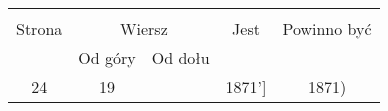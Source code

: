 \documentclass[a4paper,11pt]{article}
\begin{document}


\begin{center}

  \begin{tabular}{|c|c|c|c|c|}
    \hline
    & \multicolumn{2}{c|}{} & & \\
    Strona & \multicolumn{2}{c|}{Wiersz} & Jest
                              & Powinno być \\ \cline{2-3}
    & Od góry & Od dołu & & \\
    \hline
    24 & 19 & & 1871'] & 1871) \\
    \hline
  \end{tabular}

\end{center}


\vspace{\spaceOne}













{}






\end{document}
